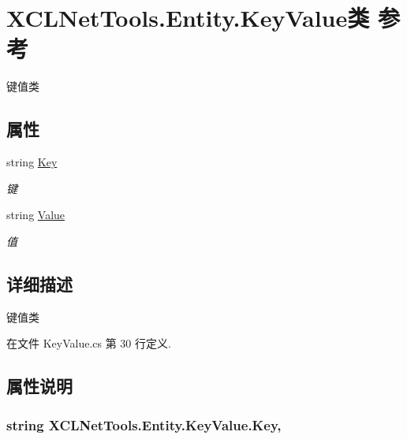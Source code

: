 \hypertarget{class_x_c_l_net_tools_1_1_entity_1_1_key_value}{\section{X\-C\-L\-Net\-Tools.\-Entity.\-Key\-Value类 参考}
\label{class_x_c_l_net_tools_1_1_entity_1_1_key_value}
}


键值类  


\subsection*{属性}
\begin{DoxyCompactItemize}
\item 
string \hyperlink{class_x_c_l_net_tools_1_1_entity_1_1_key_value_a33e2f7bfdcc6a1dce560304a4450cf08}{Key}
\begin{DoxyCompactList}\small\item\em 键 \end{DoxyCompactList}\item 
string \hyperlink{class_x_c_l_net_tools_1_1_entity_1_1_key_value_a9ec3c76143930f64c1e0de2074514bae}{Value}
\begin{DoxyCompactList}\small\item\em 值 \end{DoxyCompactList}\end{DoxyCompactItemize}


\subsection{详细描述}
键值类 



在文件 Key\-Value.\-cs 第 30 行定义.



\subsection{属性说明}
\hypertarget{class_x_c_l_net_tools_1_1_entity_1_1_key_value_a33e2f7bfdcc6a1dce560304a4450cf08}{
\subsubsection[{Key}]{\setlength{\rightskip}{0pt plus 5cm}string X\-C\-L\-Net\-Tools.\-Entity.\-Key\-Value.\-Key\hspace{0.3cm}{\ttfamily [get]}, {\ttfamily [set]}}}\label{class_x_c_l_net_tools_1_1_entity_1_1_key_value_a33e2f7bfdcc6a1dce560304a4450cf08}


